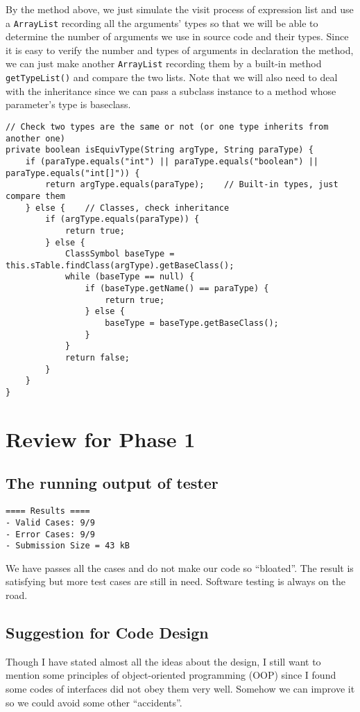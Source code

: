 \documentclass[letterpaper, 14pt]{article}
\begin{document}
By the method above, we just simulate the visit process of expression list and use a \texttt{ArrayList} recording all the arguments' types so that we will be able to determine the number of arguments we use in source code and their types. Since it is easy to verify the number and types of arguments in declaration the method, we can just make another \texttt{ArrayList} recording them by a built-in method \texttt{getTypeList()} and compare the two lists. Note that we will also need to deal with the inheritance since we can pass a subclass instance to a method whose parameter's type is baseclass.  
\begin{lstlisting}
// Check two types are the same or not (or one type inherits from another one)
private boolean isEquivType(String argType, String paraType) {
	if (paraType.equals("int") || paraType.equals("boolean") || paraType.equals("int[]")) {
		return argType.equals(paraType);	// Built-in types, just compare them
	} else {	// Classes, check inheritance
		if (argType.equals(paraType)) {
			return true;
		} else {
			ClassSymbol baseType = this.sTable.findClass(argType).getBaseClass();
			while (baseType == null) {
				if (baseType.getName() == paraType) {
					return true;
				} else {
					baseType = baseType.getBaseClass();
				}
			}
			return false;
		}
	}
}
\end{lstlisting}

\section{Review for Phase 1}
\subsection{The running output of tester}
\begin{lstlisting}
==== Results ====
- Valid Cases: 9/9
- Error Cases: 9/9
- Submission Size = 43 kB
\end{lstlisting}

We have passes all the cases and do not make our code so ``bloated''. The 
result is satisfying but more test cases are still in need. Software testing
is always on the road. 

\subsection{Suggestion for Code Design}

Though I have stated almost all the ideas about the design, I still want to mention
some principles of object-oriented programming (OOP) since I found some codes of interfaces
did not obey them very well. Somehow we can improve it so we could avoid 
some other ``accidents''. 
\end{document}
